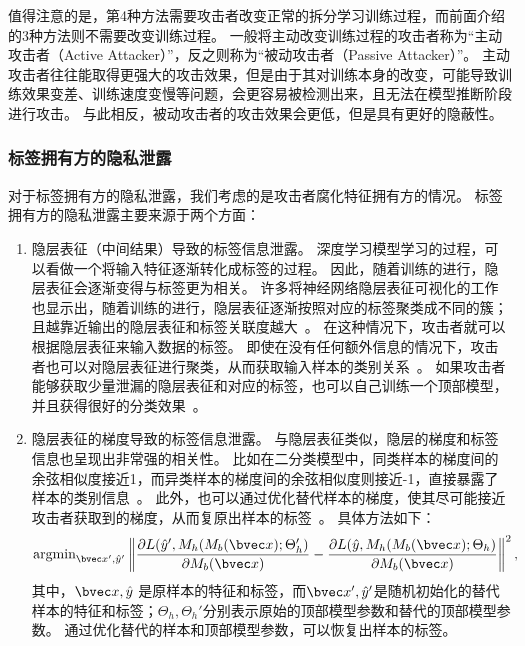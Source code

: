 值得注意的是，第4种方法需要攻击者改变正常的拆分学习训练过程，而前面介绍的3种方法则不需要改变训练过程。
%
一般将主动改变训练过程的攻击者称为“主动攻击者（Active Attacker）”，反之则称为“被动攻击者（Passive Attacker）”。
%
主动攻击者往往能取得更强大的攻击效果，但是由于其对训练本身的改变，可能导致训练效果变差、训练速度变慢等问题，会更容易被检测出来，且无法在模型推断阶段进行攻击。
与此相反，被动攻击者的攻击效果会更低，但是具有更好的隐蔽性。

\subsubsection{标签拥有方的隐私泄露}
对于标签拥有方的隐私泄露，我们考虑的是攻击者腐化特征拥有方的情况。
%
标签拥有方的隐私泄露主要来源于两个方面：
\begin{enumerate}
    \item 隐层表征（中间结果）导致的标签信息泄露。
    深度学习模型学习的过程，可以看做一个将输入特征逐渐转化成标签的过程。
    因此，随着训练的进行，隐层表征会逐渐变得与标签更为相关。
    许多将神经网络隐层表征可视化的工作也显示出，随着训练的进行，隐层表征逐渐按照对应的标签聚类成不同的簇；且越靠近输出的隐层表征和标签关联度越大~\cite{paulo2017visualize_hidden,pezzotti2017deepeyes,cantareira2020hidden_vector_fields}。
    在这种情况下，攻击者就可以根据隐层表征来输入数据的标签。
    即使在没有任何额外信息的情况下，攻击者也可以对隐层表征进行聚类，从而获取输入样本的类别关系~\cite{liujunlin2022clustering_attack,liujunlin2023distance_attack}。
    如果攻击者能够获取少量泄漏的隐层表征和对应的标签，也可以自己训练一个顶部模型，并且获得很好的分类效果~\cite{fucong2022label_infer_attack}。
    \item 隐层表征的梯度导致的标签信息泄露。
    与隐层表征类似，隐层的梯度和标签信息也呈现出非常强的相关性。
    比如在二分类模型中，同类样本的梯度间的余弦相似度接近1，而异类样本的梯度间的余弦相似度则接近-1，直接暴露了样本的类别信息~\cite{oscarli2022label_defense_marvell}。
    此外，也可以通过优化替代样本的梯度，使其尽可能接近攻击者获取到的梯度，从而复原出样本的标签~\cite{erdogan2022unsplit}。
    具体方法如下：
    \begin{equation}
        \text{argmin}_{\bvec x', \hat y'} \left\Vert \dfrac{\partial L(\hat y', M_h(M_b(\bvec x);\Theta_h')}{\partial M_b(\bvec x)} - \dfrac{\partial L(\hat y, M_h(M_b(\bvec x);\Theta_h)}{\partial M_b(\bvec x)} \right\Vert^2,
    \end{equation}
    其中，$\bvec x, \hat y$ 是原样本的特征和标签，而$\bvec x', \hat y'$是随机初始化的替代样本的特征和标签；$\Theta_h, \Theta_h'$分别表示原始的顶部模型参数和替代的顶部模型参数。
    通过优化替代的样本和顶部模型参数，可以恢复出样本的标签。
\end{enumerate}

